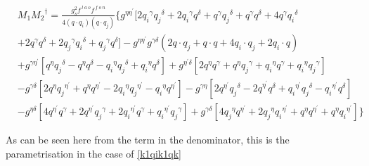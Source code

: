 \begin{equation}
\begin{split}
&M_1{M_2}^{\dagger}=\frac{g_s^2 f^{\:l\:a\:o} f^{\:f\: o\:n}}{4(q \cdot q_i) (q \cdot q_j)}\lbrace g^{{{\eta}}{{\eta}^{\prime}}}[2{q_i}^{{\gamma}}{q_j}^{\delta}+2{q_i}^{{\gamma}}{q}^{\delta}+{q}^{{\gamma}}{q_j}^{\delta}+{q}^{{\gamma}}{q}^{\delta}+4q^{{\gamma}}{q_i}^{\delta}\\
&+2q^{{\gamma}}{q}^{\delta}+2{q_j}^{{\gamma}}{q_i}^{\delta}+{q_j}^{{\gamma}}{q}^{\delta}]-g^{{{\eta}}{{\eta}^{\prime}}}g^{{{\gamma}}{{\delta}}}(2q\cdot q_j+ q\cdot q+4q_i \cdot q_j+2q_i \cdot q)\\
&+g^{{{\gamma}}{{\eta}^{\prime}}}[{q}^{{\eta}}{q_j}^{\delta}-{q}^{{\eta}}{q}^{\delta}-{q_i}^{{\eta}}{q_j}^{\delta}+{q_i}^{{\eta}}{q}^{\delta}]+g^{{{\eta}^{\prime}}{{\delta}}}[2{q}^{{\eta}}{q}^{\gamma}+{q}^{{\eta}}{q_j}^{\gamma}+{q_i}^{{\eta}}{q}^{\gamma}+{q_i}^{{\eta}}{q_j}^{\gamma}]\\
&-g^{{{\gamma}}{{\delta}}}[2{q}^{\eta}{q_j}^{{\eta}^{\prime}}+{q}^{\eta}{q}^{{\eta}^{\prime}}-2{q_i}^{\eta}{q_j}^{{\eta}^{\prime}}-{q_i}^{\eta}{q}^{{\eta}^{\prime}}]-g^{{{\gamma}}{{\eta}}}[2{q}^{{\eta}^{\prime}}{q_j}^{{\delta}}-{2q}^{{\eta}^{\prime}}{q}^{{\delta}}+{q_i}^{{\eta}^{\prime}}{q_j}^{{\delta}}-{q_i}^{{\eta}^{\prime}}{q}^{{\delta}}]\\
&-g^{{{\eta}}{{\delta}}}[4{q}^{{\eta}^{\prime}}{q}^{{\gamma}}+2{q}^{{\eta}^{\prime}}{q_j}^{{\gamma}}+2{q_i}^{{\eta}^{\prime}}{q}^{{\gamma}}+{q_i}^{{\eta}^{\prime}}{q_j}^{{\gamma}}]+g^{{{\gamma}}{{\delta}}}[4{q_j}^{{\eta}}{q}^{{\eta}^{\prime}}+2{q_j}^{{\eta}}{q_i}^{{\eta}^{\prime}}+{q}^{{\eta}}{q}^{{\eta}^{\prime}}+{q}^{{\eta}}{q_i}^{{\eta}^{\prime}}]\rbrace
\end{split}
\end{equation}

As can be seen here from the term in the denominator, this is the parametrisation in the case of \eqref{k1qik1qk}

